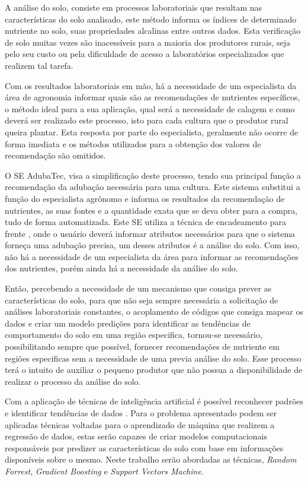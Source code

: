 \documentclass[
12pt,				%
oneside,			%
a4paper,			%
english,			%
french,				%
spanish,			%
brazil				%
]{abntex2}
\begin{document}
A análise do solo, consiste em processos laboratoriais que resultam nas características do solo analisado, este método informa os índices de determinado nutriente no solo, suas propriedades alcalinas entre outros dados. Esta verificação de solo muitas vezes são inacessíveis para a maioria dos produtores rurais, seja pelo seu custo ou pela dificuldade de acesso a laboratórios especializados que realizem tal tarefa.\cite{claessen1997manual}

Com os resultados laboratoriais em mão, há a necessidade de um especialista da área de agronomia informar quais são as recomendações de nutrientes específicos, o método ideal para a sua aplicação, qual será a necessidade de calagem e como deverá ser realizado este processo, isto para cada cultura que o produtor rural queira plantar. Esta resposta por parte do especialista, geralmente não ocorre de forma imediata e os métodos utilizados para a obtenção dos valores de recomendação são omitidos.    


O SE AdubaTec, visa a simplificação deste processo, tendo sua principal função a recomendação da adubação necessária para uma cultura. Este sistema substitui a função do especialista agrônomo e informa os resultados da recomendação de nutrientes, as suas fontes e a quantidade exata que se deva obter para a compra, tudo de forma automatizada. Este SE utiliza a técnica de encadeamento para frente \cite{giarratano1998expert}, onde o usuário deverá informar atributos necessários para que o sistema forneça uma adubação precisa, um desses atributos é a análise do solo. Com isso, não há a necessidade de um especialista da área para informar as recomendações dos nutrientes, porém ainda há a necessidade da análise do solo.
 
Então, percebendo a necessidade de um mecanismo que consiga prever as características do solo, para que não seja sempre necessária a solicitação de análises laboratoriais constantes, o acoplamento de códigos que consiga mapear os dados e criar um modelo predições para identificar as tendências de comportamento do solo em uma região especifica, tornou-se necessário, possibilitando sempre que possível, fornecer recomendações de nutriente em regiões especificas sem a necessidade de uma previa análise do solo. Esse processo terá o intuito de auxiliar o pequeno produtor que não possua a disponibilidade de realizar o processo da análise do solo.        

Com a aplicação de técnicas de inteligência artificial é possível reconhecer padrões e identificar tendências de dados \cite{henderson2009encyclopedia}. Para o problema apresentado podem ser aplicadas técnicas voltadas para o aprendizado de máquina que realizem a regressão de dados, estas serão capazes de criar modelos computacionais responsáveis por predizer as características do solo com base em informações disponíveis sobre o mesmo. Neste trabalho serão abordadas as técnicas,  \textit{Random Forrest}, \textit{Gradient Boosting} e \textit{Support Vectors Machine}.
 
\end{document}
